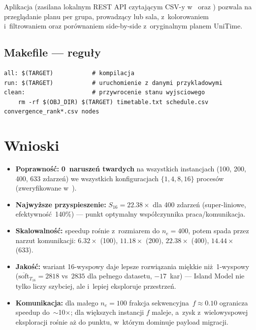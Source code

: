 \documentclass{common/sprawozdanie-agh}
\begin{document}
Aplikacja  (zasilana lokalnym REST API  czytającym CSV-y w~ oraz ) pozwala na przeglądanie planu per grupa, prowadzący lub sala, z~kolorowaniem i~filtrowaniem oraz porównaniem side-by-side z~oryginalnym planem UniTime.

\subsection{Makefile --- reguły}

\begin{lstlisting}[style=makefilestyle, caption={Kluczowe reguły Makefile}]
all: $(TARGET)           # kompilacja
run: $(TARGET)           # uruchomienie z danymi przykladowymi
clean:                   # przywrocenie stanu wyjsciowego
    rm -rf $(OBJ_DIR) $(TARGET) timetable.txt schedule.csv convergence_rank*.csv nodes
\end{lstlisting}

\section{Wnioski}

\begin{itemize}
    \item \textbf{Poprawność:} \textbf{0~naruszeń twardych} na wszystkich instancjach (100, 200, 400, 633 zdarzeń) we wszystkich konfiguracjach $\{1, 4, 8, 16\}$ procesów (zweryfikowane w~).
    \item \textbf{Najwyższe przyspieszenie:} $S_{16}=22.38\times$ dla 400 zdarzeń (super-liniowe, efektywność~140\%) --- punkt optymalny współczynnika praca/komunikacja.
    \item \textbf{Skalowalność:} speedup rośnie z~rozmiarem do $n_e=400$, potem spada przez narzut komunikacji: $6.32\times$ (100), $11.18\times$ (200), $\mathbf{22.38\times}$ (400), $14.44\times$ (633).
    \item \textbf{Jakość:} wariant 16-wyspowy daje lepsze rozwiązania miękkie niż~1-wyspowy ($\overline{\text{soft}}_{T_{16}}=2818$ vs~$2835$ dla pełnego datasetu, $-17$~kar) --- Island Model nie tylko liczy szybciej, ale i~lepiej eksploruje przestrzeń.
    \item \textbf{Komunikacja:} dla małego $n_e=100$ frakcja sekwencyjna~$f \approx 0.10$ ogranicza speedup do~$\sim$10$\times$; dla większych instancji $f$ maleje, a~zysk z~wielowyspowej eksploracji rośnie aż do punktu, w~którym dominuje payload migracji.
\end{itemize}
\end{document}
